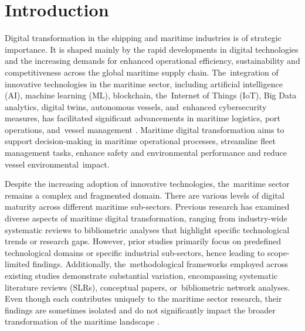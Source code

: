 \documentclass[jmse,review,accept,pdftex,moreauthors]{Definitions/mdpi}
\begin{document}

\section{Introduction}

Digital transformation in the shipping and maritime industries is of strategic importance. It is shaped mainly by the rapid developments in digital technologies and the increasing demands for enhanced operational efficiency, sustainability and competitiveness across the global maritime supply chain. The~integration of innovative technologies in the maritime sector, including artificial intelligence (AI), machine learning (ML), blockchain, the~Internet of Things (IoT), Big Data analytics, digital twins, autonomous vessels, and~enhanced cybersecurity measures, has facilitated significant advancements in maritime logistics, port operations, and~vessel management \citep{tijan2021digital,an2024maritime}. Maritime digital transformation aims to support decision-making in maritime operational processes, streamline fleet management tasks, enhance safety and environmental performance and reduce vessel environmental~impact.

Despite the increasing adoption of innovative technologies, the~maritime sector remains a complex and fragmented domain. There are various levels of digital maturity across different maritime sub-sectors. Previous research has examined diverse aspects of maritime digital transformation, ranging from industry-wide systematic reviews to bibliometric analyses that highlight specific technological trends or research gaps. However, prior studies primarily focus on predefined technological domains or specific industrial sub-sectors, hence leading to scope-limited findings. Additionally, the~methodological frameworks employed across existing studies demonstrate substantial variation, encompassing systematic literature reviews (SLRs), conceptual papers, or~bibliometric network analyses. Even though each contributes uniquely to the maritime sector research, their findings are sometimes isolated and do not significantly impact the broader transformation of the maritime landscape \citep{lau2024maritime,ouguz2024studies}. 
\end{document}
